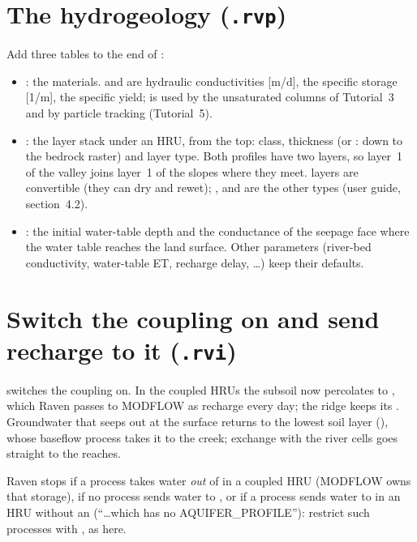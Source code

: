 \section{The hydrogeology (\texttt{.rvp})}
Add three tables to the end of :
\begin{itemize}
\item {}: the materials.  and  are hydraulic conductivities [m/d],
       the specific storage [1/m],  the specific yield;  is used by the
      unsaturated columns of Tutorial~3 and by particle tracking (Tutorial~5).
\item {}: the layer stack under an HRU, from the top: class, thickness (or : down to the
      bedrock raster) and layer type. Both profiles have two layers, so layer~1 of the valley joins layer~1 of the slopes
      where they meet.  layers are convertible (they can dry and rewet); ,
       and  are the other types (user guide, section~4.2).
\item {}: the initial water-table depth and the conductance of the seepage face where the water
      table reaches the land surface. Other parameters (river-bed conductivity, water-table ET, recharge delay, \dots)
      keep their defaults.
\end{itemize}

\section{Switch the coupling on and send recharge to it (\texttt{.rvi})}
 switches the coupling on. In the coupled HRUs the subsoil now percolates to
, which Raven passes to MODFLOW as recharge every day; the ridge keeps its . Groundwater
that seeps out at the surface returns to the lowest soil layer (), whose baseflow process takes it to the
creek; exchange with the river cells goes straight to the reaches.
\begin{trouble}
Raven stops if a process takes water \emph{out} of  in a coupled HRU (MODFLOW owns that storage), if no
process sends water to , or if a process sends water to  in an HRU without an
 (``\dots which has no AQUIFER\_PROFILE''): restrict such processes with , as here.
\end{trouble}

